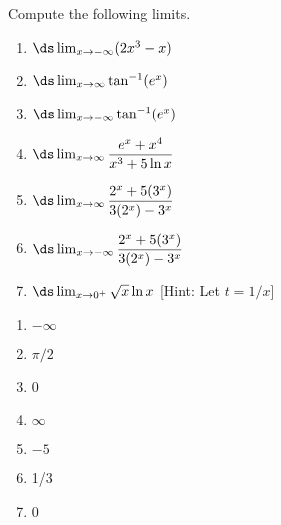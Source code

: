 \begin{enumialphparenastyle}
\begin{ex}
	Compute the following limits.
	\begin{enumerate}
		\item	$\ds\lim_{x\to -\infty}(2x^3-x)$
		\item	$\ds\lim_{x\to \infty}\tan^{-1}(e^x)$
		\item	$\ds\lim_{x\to -\infty}\tan^{-1}(e^x)$
		\item	$\ds\lim_{x\to \infty}\dfrac{e^x+x^4}{x^3+5\ln x}$
		\item	$\ds\lim_{x\to \infty}\dfrac{2^x+5(3^x)}{3(2^x)-3^x}$
		\item	$\ds\lim_{x\to -\infty}\dfrac{2^x+5(3^x)}{3(2^x)-3^x}$
		\item	$\ds\lim_{x\to 0^{+}}\sqrt{x}\ln x$ [Hint: Let $t=1/x$]
	\end{enumerate}
	\begin{sol}
		\begin{enumerate}
			\item	$-\infty$
			\item	$\pi/2$
			\item	0
			\item	$\infty$
			\item	$-5$
			\item	1/3
			\item	0
		\end{enumerate}
	\end{sol}
\end{ex}


\end{enumialphparenastyle}